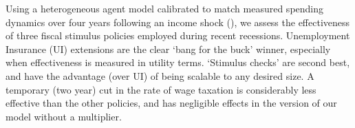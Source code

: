 \documentclass[../HAFiscal]{subfiles}
\begin{document}
Using a heterogeneous agent model calibrated to match measured spending dynamics over four years following an income shock (\cite{fagereng_mpc_2021}), we assess the effectiveness of three fiscal stimulus policies employed during recent recessions.  Unemployment Insurance (UI) extensions are the clear `bang for the buck' winner, especially when effectiveness is measured in utility terms.  `Stimulus checks' are second best, and have the advantage (over UI) of being scalable to any desired size.  A temporary (two year) cut in the rate of wage taxation is considerably less effective than the other policies, and has negligible effects in the version of our model without a multiplier.
\end{document}
